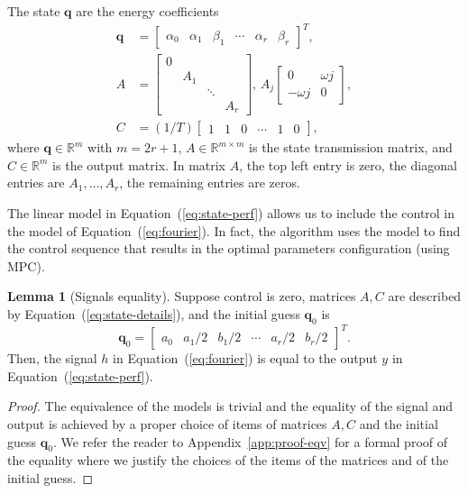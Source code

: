 \documentclass[letterpaper,10pt,conference]{ieeeconf}
\theoremstyle{definition}
\newtheorem{lem}[thm]{Lemma}
\begin{document}
The state $\mathbf{q}$ are the energy coefficients
\begin{equation}\label{eq:state-details}\begin{split}
  \mathbf{q}&=\left[\begin{array}{cccccc}
    \alpha_0 & \alpha_1 & \beta_1 & \cdots & \alpha_r & \beta_r
  \end{array}\right]^T,\\
  A&=\left[\begin{array}{cccc}
    0&    &       &  \\
     & A_1&       &  \\
     &    & \ddots&  \\
     &    &       & A_r 
  \end{array}\right],\,A_j\begin{bmatrix}0 & \omega j \\ -\omega j & 0\end{bmatrix},\\
  C&=(1/T)\left[\begin{array}{cccccc}
    1 & 1 & 0 &\cdots & 1 & 0
  \end{array}\right],
\end{split}\end{equation}
where $\mathbf{q}\in\mathbb{R}^m$ with $m=2r+1$, $A\in\mathbb{R}^{m\times m}$ is the state transmission matrix, and $C\in\mathbb{R}^m$ is the output matrix. In matrix $A$, the top left entry is zero, the diagonal entries are $A_1,\dots,A_r$, the remaining entries are zeros.

The linear model in Equation~(\ref{eq:state-perf}) allows us to include the control in the model of Equation~(\ref{eq:fourier}). In fact, the algorithm uses the model to find the control sequence that results in the optimal parameters configuration (using MPC). 

\begin{lem}[Signals equality]\label{lem:eqv}Suppose control is zero, matrices $A,C$ are described by Equation~(\ref{eq:state-details}), and the initial guess $\mathbf{q}_0$ is 
  \begin{equation*}
  \mathbf{q}_0=\begin{bmatrix}a_0 & a_1/2 & b_1/2 & \cdots & a_r/2 & b_r/2\end{bmatrix}^T.
  \end{equation*} 
  Then, the signal $h$ in Equation~(\ref{eq:fourier}) is equal to the output $y$ in Equation~(\ref{eq:state-perf}).
\end{lem}
\begin{proof}
The equivalence of the models is trivial and the equality of the signal and output is achieved by a proper choice of items of matrices $A,C$ and the initial guess $\mathbf{q}_0$. We refer the reader to Appendix~\ref{app:proof-eqv} for a formal proof of the equality where we justify the choices of the items of the matrices and of the initial guess. 
\end{proof}
\end{document}
